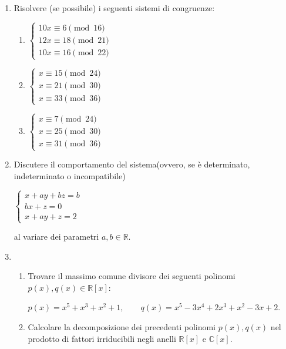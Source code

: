 \documentclass[fleqn]{article}
\begin{document}
\begin{enumerate}
   \item Risolvere (se possibile) i seguenti sistemi di congruenze:
   
   \begin{enumerate} 
      \item \begin{center} 
      $ \begin{cases}
         10x \equiv 6 \pmod{16} \\
         12x \equiv 18 \pmod{21} \\
         10x \equiv 16 \pmod{22} 
      \end{cases} $
      \end{center}
      \item \begin{center} 
      $ \begin{cases}
         x \equiv 15 \pmod{24} \\
         x \equiv 21 \pmod{30} \\
         x \equiv 33 \pmod{36} 
      \end{cases} $
      \end{center}
      \item \begin{center}
      $ \begin{cases}
         x \equiv 7 \pmod{24} \\
         x \equiv 25 \pmod{30} \\
         x \equiv 31 \pmod{36} 
      \end{cases} $
      \end{center}
   \end{enumerate}

   \item Discutere il comportamento del sistema(ovvero, se è determinato, indeterminato o incompatibile)
   \begin{center}
   $\begin{cases} 
      x + ay + bz = b \\
      bx + z = 0 \\
      x + ay + z = 2
   \end{cases}$ \\
   \end{center}
   al variare dei parametri $a,b \in \mathbb{R}$.

   \item \begin{enumerate}
      \item Trovare il massimo comune divisore dei seguenti polinomi $p(x),q(x) \in \mathbb{R}[x]$:
      \begin{center}
         $p(x)= x^5 + x^3 + x^2 + 1, \qquad q(x)=x^5-3x^4+2x^3+x^2-3x+2$.
      \end{center}
      \item Calcolare la decomposizione dei precedenti polinomi $p(x),q(x)$ nel prodotto di fattori irriducibili
      negli anelli $\mathbb{R}[x]$ e $\mathbb{C}[x]$.
   \end{enumerate}


\end{enumerate}
\end{document}
